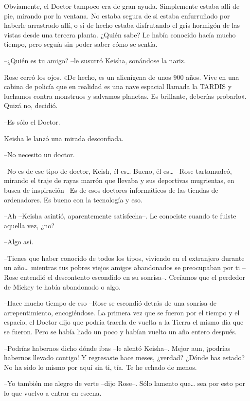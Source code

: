 {Obviamente, el Doctor tampoco era de gran ayuda. Simplemente estaba
 allí de pie, mirando por la ventana. No estaba segura de si estaba
 enfurruñado por haberle arrastrado allí, o si de hecho estaba
 disfrutando el gris hormigón de las vistas desde una tercera planta.
 ¿Quién sabe? Le había conocido hacía mucho tiempo, pero seguía sin poder
saber cómo se sentía.}

{--¿Quién es tu amigo? --le susurró Keisha, sonándose la nariz.}

{Rose cerró los ojos. «De hecho, es un alienígena de unos 900 años. Vive
 en una cabina de policía que en realidad es una nave espacial llamada la
 TARDIS y luchamos contra monstruos y salvamos planetas. Es brillante,
deberías probarlo». Quizá no, decidió.}

{--Es sólo el Doctor.}

{Keisha le lanzó una mirada desconfiada.}

{--No necesito un doctor.}

{--No es de ese tipo de doctor, Keish, él es\ldots{} Bueno, él
 es\ldots{} --Rose tartamudeó, mirando el traje de rayas marrón que
 llevaba y sus deportivas mugrientas, en busca de inspiración-- Es de
 esos doctores informáticos de las tiendas de ordenadores. Es bueno con
la tecnología y eso.}

{--Ah --Keisha asintió, aparentemente satisfecha--. Le conociste cuando
te fuiste aquella vez, ¿no?}

{--Algo así.}

{--Tienes que haber conocido de todos los tipos, viviendo en el
 extranjero durante un año\ldots{} mientras tus pobres viejos amigos
 abandonados se preocupaban por ti --Rose entendió el descontento
 escondido en su sonrisa--. Creíamos que el perdedor de Mickey te había
abandonado o algo.}

{--Hace mucho tiempo de eso --Rose se escondió detrás de una sonrisa de
 arrepentimiento, encogiéndose. La primera vez que se fueron por el
 tiempo y el espacio, el Doctor dijo que podría traerla de vuelta a la
 Tierra el mismo día que se fueron. Pero se había liado un poco y habían
vuelto un año entero después.}

{--Podrías habernos dicho dónde ibas --le alentó Keisha--. Mejor aun,
 ¡podrías habernos llevado contigo! Y regresaste hace meses, ¿verdad?
 ¿Dónde has estado? No ha sido lo mismo por aquí sin ti, tía. Te he
echado de menos.}

{--Yo también me alegro de verte --dijo Rose--. Sólo lamento que\ldots{}
sea por esto por lo que vuelvo a entrar en escena.}

